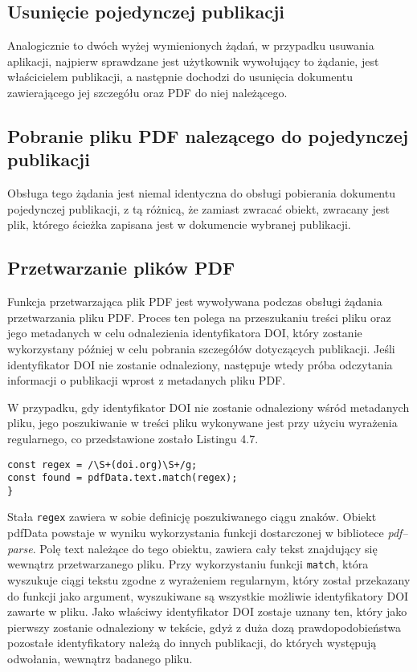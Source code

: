 \documentclass[a4paper,12pt,twoside,openany]{report}
\begin{document}
\subsection{Usunięcie pojedynczej publikacji}
Analogicznie to dwóch wyżej wymienionych żądań, w przypadku usuwania aplikacji, najpierw sprawdzane jest użytkownik wywołujący to żądanie, jest właścicielem publikacji, a następnie dochodzi do usunięcia dokumentu zawierającego jej szczegółu oraz PDF do niej należącego.

\subsection{Pobranie pliku PDF nalezącego do pojedynczej publikacji}
Obsługa tego żądania jest niemal identyczna do obsługi pobierania dokumentu pojedynczej publikacji, z tą różnicą, że zamiast zwracać obiekt, zwracany jest plik, którego ścieżka zapisana jest w dokumencie wybranej publikacji.

\subsection{Przetwarzanie plików PDF}
Funkcja przetwarzająca plik PDF jest wywoływana podczas obsługi żądania przetwarzania pliku PDF. Proces ten polega na przeszukaniu treści pliku oraz jego metadanych w celu odnalezienia identyfikatora DOI, który zostanie wykorzystany później w celu pobrania szczegółów dotyczących publikacji. Jeśli identyfikator DOI nie zostanie odnaleziony, następuje wtedy próba odczytania informacji o publikacji wprost z metadanych pliku PDF.

W przypadku, gdy identyfikator DOI nie zostanie odnaleziony wśród metadanych pliku, jego poszukiwanie w treści pliku wykonywane jest przy użyciu wyrażenia regularnego, co przedstawione zostało Listingu 4.7.

\begin{lstlisting}[caption=Wykorzystanie wyrażenia regularnego do poszukiwania DOI,label=code1,captionpos=b]
const regex = /\S+(doi.org)\S+/g;
const found = pdfData.text.match(regex);
}
\end{lstlisting}
Stała \verb|regex| zawiera w sobie definicję poszukiwanego ciągu znaków. Obiekt pdfData powstaje w wyniku wykorzystania funkcji dostarczonej w bibliotece \textit{pdf--parse}. Polę text należące do tego obiektu, zawiera cały tekst znajdujący się wewnątrz przetwarzanego pliku. Przy wykorzystaniu funkcji \verb|match|, która wyszukuje ciągi tekstu zgodne z wyrażeniem regularnym, który został przekazany do funkcji jako argument, wyszukiwane są wszystkie możliwie identyfikatory DOI zawarte w pliku. Jako właściwy identyfikator DOI zostaje uznany ten, który jako pierwszy zostanie odnaleziony w tekście, gdyż z duża dozą prawdopodobieństwa pozostałe identyfikatory należą do innych publikacji, do których występują odwołania, wewnątrz badanego pliku.
\end{document}
